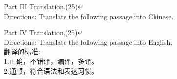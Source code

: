 \documentclass[12pt,lang=en,thmcnt=section]{elegantbook}
\begin{document}
Part III Translation.(25)↵\\
Directions: Translate the following passage into Chinese.

Part IV Translation,(25)↵\\
Directions: Translate the following passage into English.\\
翻译的标准:\\
1.正确，不错译，漏译，多译。\\
2.通顺，符合语法和表达习惯。








\end{document}
